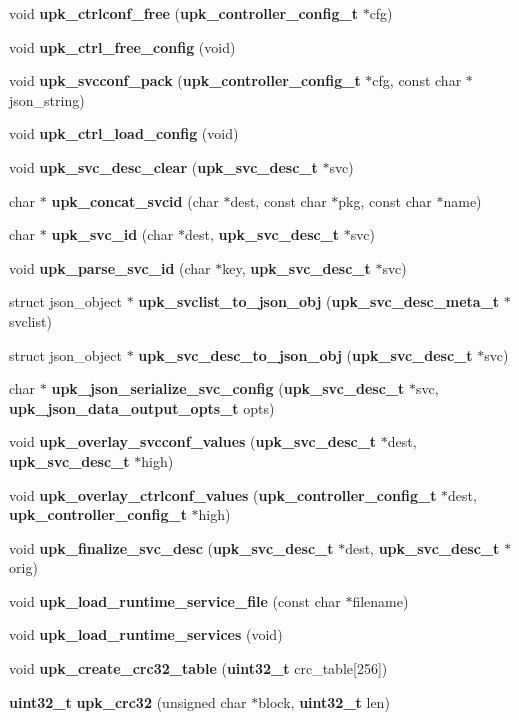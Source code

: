 \begin{DoxyCompactItemize}
\item 
void {\bf upk\_\-ctrlconf\_\-free} ({\bf upk\_\-controller\_\-config\_\-t} $\ast$cfg)
\item 
void {\bf upk\_\-ctrl\_\-free\_\-config} (void)
\item 
void {\bf upk\_\-svcconf\_\-pack} ({\bf upk\_\-controller\_\-config\_\-t} $\ast$cfg, const char $\ast$json\_\-string)
\item 
void {\bf upk\_\-ctrl\_\-load\_\-config} (void)
\item 
void {\bf upk\_\-svc\_\-desc\_\-clear} ({\bf upk\_\-svc\_\-desc\_\-t} $\ast$svc)
\item 
char $\ast$ {\bf upk\_\-concat\_\-svcid} (char $\ast$dest, const char $\ast$pkg, const char $\ast$name)
\item 
char $\ast$ {\bf upk\_\-svc\_\-id} (char $\ast$dest, {\bf upk\_\-svc\_\-desc\_\-t} $\ast$svc)
\item 
void {\bf upk\_\-parse\_\-svc\_\-id} (char $\ast$key, {\bf upk\_\-svc\_\-desc\_\-t} $\ast$svc)
\item 
struct json\_\-object $\ast$ {\bf upk\_\-svclist\_\-to\_\-json\_\-obj} ({\bf upk\_\-svc\_\-desc\_\-meta\_\-t} $\ast$svclist)
\item 
struct json\_\-object $\ast$ {\bf upk\_\-svc\_\-desc\_\-to\_\-json\_\-obj} ({\bf upk\_\-svc\_\-desc\_\-t} $\ast$svc)
\item 
char $\ast$ {\bf upk\_\-json\_\-serialize\_\-svc\_\-config} ({\bf upk\_\-svc\_\-desc\_\-t} $\ast$svc, {\bf upk\_\-json\_\-data\_\-output\_\-opts\_\-t} opts)
\item 
void {\bf upk\_\-overlay\_\-svcconf\_\-values} ({\bf upk\_\-svc\_\-desc\_\-t} $\ast$dest, {\bf upk\_\-svc\_\-desc\_\-t} $\ast$high)
\item 
void {\bf upk\_\-overlay\_\-ctrlconf\_\-values} ({\bf upk\_\-controller\_\-config\_\-t} $\ast$dest, {\bf upk\_\-controller\_\-config\_\-t} $\ast$high)
\item 
void {\bf upk\_\-finalize\_\-svc\_\-desc} ({\bf upk\_\-svc\_\-desc\_\-t} $\ast$dest, {\bf upk\_\-svc\_\-desc\_\-t} $\ast$orig)
\item 
void {\bf upk\_\-load\_\-runtime\_\-service\_\-file} (const char $\ast$filename)
\item 
void {\bf upk\_\-load\_\-runtime\_\-services} (void)
\item 
void {\bf upk\_\-create\_\-crc32\_\-table} ({\bf uint32\_\-t} crc\_\-table[256])
\item 
{\bf uint32\_\-t} {\bf upk\_\-crc32} (unsigned char $\ast$block, {\bf uint32\_\-t} len)

\end{DoxyCompactItemize}
